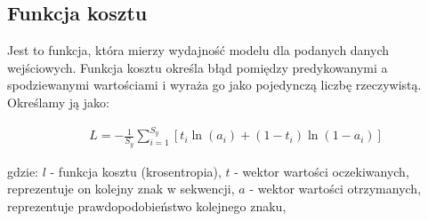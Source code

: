 \subsection{Funkcja kosztu}
Jest to funkcja, która mierzy wydajność modelu dla podanych danych wejściowych.
Funkcja kosztu określa błąd pomiędzy predykowanymi a spodziewanymi wartościami i wyraża go jako pojedynczą 
liczbę rzeczywistą. 
Określamy ją jako:

\begin{align*}
  &L = - \frac{1}{S_y}\sum_{i=1}^{S_y}[t_i\ln(a_i) + (1-t_i)\ln(1-a_i)]
\end{align*}

gdzie: \newline
$l$ - funkcja kosztu (krosentropia), \newline
$t$ - wektor wartości oczekiwanych, reprezentuje on kolejny znak w sekwencji, \newline
$a$ - wektor wartości otrzymanych, reprezentuje prawdopodobieństwo kolejnego znaku,  \newline
